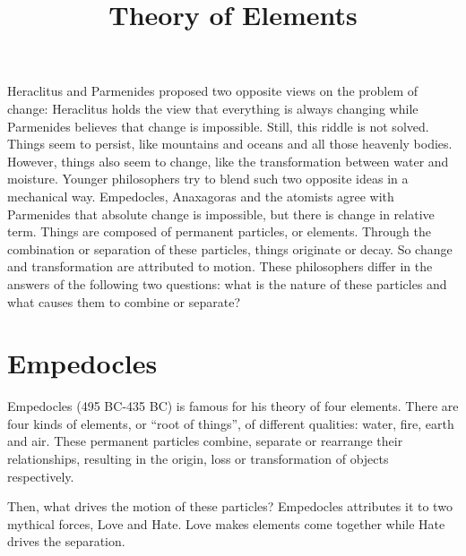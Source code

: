 \documentclass[11pt]{article}
\title{Theory of Elements}
\date{}
\begin{document}
  \maketitle
  
  \newpage

  \linenumbers

Heraclitus and Parmenides proposed two opposite views on the problem of change: 
Heraclitus holds the view that everything is always changing while Parmenides believes that change is impossible. 
Still, this riddle is not solved. 
Things seem to persist, like mountains and oceans and all those heavenly bodies. 
However, things also seem to change, like the transformation between water and moisture. 
Younger philosophers try to blend such two opposite ideas in a mechanical way. 
Empedocles, Anaxagoras and the atomists agree with Parmenides that absolute change is impossible, but there is change in relative term. 
Things are composed of permanent particles, or elements. 
Through the combination or separation of these particles, things originate or decay. 
So change and transformation are attributed to motion. 
These philosophers differ in the answers of the following two questions: what is the nature of these particles and what causes them to combine or separate? 

\section{Empedocles}
Empedocles (495 BC-435 BC) is famous for his theory of four elements. 
There are four kinds of elements, or “root of things”, of different qualities: 
water, fire, earth and air. 
These permanent particles combine, separate or rearrange their relationships, resulting in the origin, loss or transformation of objects respectively.

\newline

Then, what drives the motion of these particles? 
Empedocles attributes it to two mythical forces, Love and Hate. 
Love makes elements come together while Hate drives the separation. 

\newline
\end{document}
